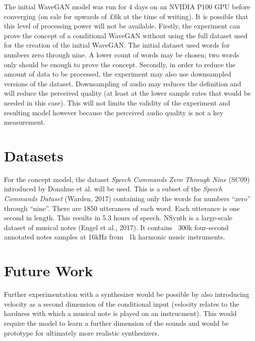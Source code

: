 \documentclass{article}
\begin{document}
The initial WaveGAN model was run for 4 days on an NVIDIA P100 GPU before converging (on sale for upwards of £6k at the time of writing).
It is possible that this level of processing power will not be available.
\newline
\newline
Firstly, the experiment can prove the concept of a conditional WaveGAN without using the full dataset used for the creation of the initial WaveGAN.
The initial dataset used words for numbers zero through nine.
A lower count of words may be chosen; two words only should be enough to prove the concept.
\newline
\newline
Secondly, in order to reduce the amount of data to be processed, the experiment may also use downsampled versions of the dataset.
Downsampling of audio may reduces the definition and will reduce the perceived quality (at least at the lower sample rates that would be needed in this case).
This will not limits the validity of the experiment and resulting model however because the perceived audio quality is not a key measurement.

\section{Datasets}

For the concept model, the dataset \textit{Speech Commands Zero Through Nine} (SC09) introduced by Donahue et al. will be used.
This is a subset of the \textit{Speech Commands Dataset} (Warden, 2017) containing only the words for numbers ``zero'' through ``nine''.
There are 1850 utterances of each word.
Each utterance is one second in length.
This results in 5.3 hours of speech.
\newline
\newline
NSynth is a large-scale dataset of musical notes (Engel et al., 2017).
It contains ~300k four-second annotated notes samples at 16kHz from ~1k harmonic music instruments.

\section{Future Work}

Further experimentation with a synthesizer would be possible by also introducing velocity as a second dimension of the conditional input (velocity relates to the hardness with which a musical note is played on an instrucment).
This would require the model to learn a further dimension of the sounds and would be prototype for ultimately more realistic synthesizers.
\end{document}
